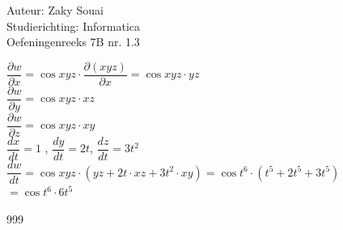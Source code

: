 \documentclass[a4paper]{article}
\begin{document}
  
\noindent \large Auteur: Zaky Souai \\
\noindent \large Studierichting:  Informatica\\
\noindent \large Oefeningenreeks 7B nr. 1.3\\

\bigskip

\normalsize

$\dfrac{\partial w}{\partial x} = \cos xyz \cdot \dfrac{\partial (xyz)}{\partial x} = \cos xyz \cdot yz$\\

$\dfrac{\partial w}{\partial y} = \cos xyz \cdot xz$\\

$\dfrac{\partial w}{\partial z} = \cos xyz \cdot xy$\\

$\dfrac{dx}{dt} = 1$ , $\dfrac{dy}{dt} = 2t$, $\dfrac{dz}{dt} = 3t^2$ \\

$\dfrac{dw}{dt} = \cos xyz \cdot (yz + 2t\cdot xz + 3t^2\cdot xy) = \cos t^6 \cdot (t^5 + 2t^5 + 3t^5)$\\

$ = \cos t^6 \cdot 6t^5$\\


\begin{thebibliography}{999}
\end{thebibliography}
\end{document}
